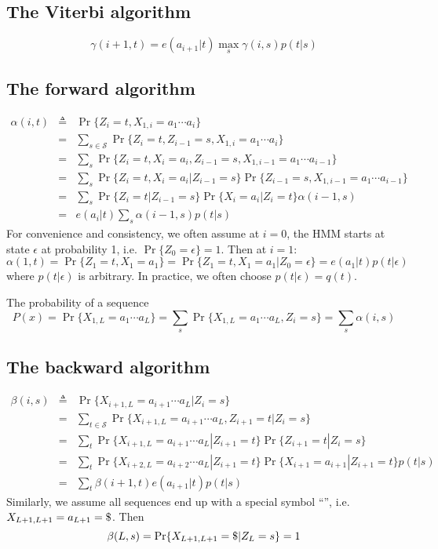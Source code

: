 \documentclass[10pt]{article}
\begin{document}
\subsection{The Viterbi algorithm}
$$
\gamma(i+1,t)=e(a_{i+1}|t)\max_s\gamma(i,s)p(t|s)
$$

\subsection{The forward algorithm}
\begin{eqnarray*}
\alpha(i,t)&\triangleq&\Pr\{Z_i=t,X_{1,i}=a_1\cdots a_i\}\\
&=&\sum_{s\in\mathcal{S}}\Pr\{Z_i=t,Z_{i-1}=s,X_{1,i}=a_1\cdots a_i\}\\
&=&\sum_s\Pr\{Z_i=t,X_i=a_i,Z_{i-1}=s,X_{1,{i-1}}=a_1\cdots a_{i-1}\}\\
&=&\sum_s\Pr\{Z_i=t,X_i=a_i|Z_{i-1}=s\}\Pr\{Z_{i-1}=s,X_{1,{i-1}}=a_1\cdots a_{i-1}\}\\
&=&\sum_s\Pr\{Z_i=t|Z_{i-1}=s\}\Pr\{X_i=a_i|Z_i=t\}\alpha(i-1,s)\\
&=&e(a_i|t)\sum_s\alpha(i-1,s)p(t|s)
\end{eqnarray*}
For convenience and consistency, we often assume at $i=0$, the HMM starts at
state $\epsilon$ at probability 1, i.e. $\Pr\{Z_0=\epsilon\}=1$. Then at $i=1$:
$$
\alpha(1,t)=\Pr\{Z_1=t,X_1=a_1\}=\Pr\{Z_1=t,X_1=a_1|Z_0=\epsilon\}=e(a_1|t)p(t|\epsilon)
$$
where $p(t|\epsilon)$ is arbitrary. In practice, we often choose
$p(t|\epsilon)=q(t)$.

The probability of a sequence
$$
P(x)=\Pr\{X_{1,L}=a_1\cdots a_L\}=\sum_s\Pr\{X_{1,L}=a_1\cdots a_L,Z_i=s\}=\sum_s\alpha(i,s)
$$

\subsection{The backward algorithm}
\begin{eqnarray*}
\beta(i,s)&\triangleq&\Pr\{X_{i+1,L}=a_{i+1}\cdots a_L|Z_i=s\}\\
&=&\sum_{t\in\mathcal{S}}\Pr\{X_{i+1,L}=a_{i+1}\cdots a_L,Z_{i+1}=t|Z_i=s\}\\
&=&\sum_t\Pr\{X_{i+1,L}=a_{i+1}\cdots a_L|Z_{i+1}=t\}\Pr\{Z_{i+1}=t|Z_i=s\}\\
&=&\sum_t\Pr\{X_{i+2,L}=a_{i+2}\cdots a_L|Z_{i+1}=t\}\Pr\{X_{i+1}=a_{i+1}|Z_{i+1}=t\}p(t|s)\\
&=&\sum_t\beta(i+1,t)e(a_{i+1}|t)p(t|s)
\end{eqnarray*}
Similarly, we assume all sequences end up with a special symbol
``{\tt{}}'', i.e. $X_{L+1,L+1}=a_{L+1}={\tt\char36}$. Then
$$
\beta(L,s)=\Pr\{X_{L+1,L+1}={\tt\char36}|Z_L=s\}=1
$$
\end{document}
